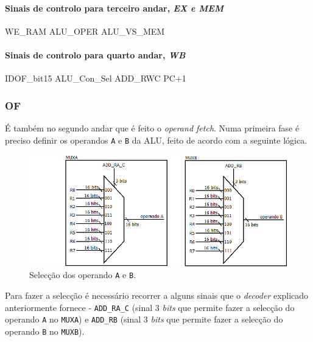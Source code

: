 \documentclass[11pt]{article}
\numberwithin{equation}{section}
\begin{document}
\paragraph{Sinais de controlo para terceiro andar, \textit{EX e MEM}}
WE\_RAM ALU\_OPER ALU\_VS\_MEM 
\paragraph{Sinais de controlo para quarto andar, \textit{WB}}
	IDOF\_bit15 ALU\_Con\_Sel ADD\_RWC PC+1







\subsubsection{OF}

É também no segundo andar que é feito o \textit{operand fetch}. Numa primeira fase é preciso definir os operandos \texttt{A} e \texttt{B} da ALU, feito de acordo com a seguinte lógica.

\begin{figure}[H]
	\centering
	\includegraphics[keepaspectratio=true, scale=0.35]{imagens/OF1}
	\caption{Selecção dos operando \texttt{A} e \texttt{B}.}
	\vspace{-0.8em}
\end{figure}

Para fazer a selecção é necessário recorrer a alguns sinais que o \textit{decoder} explicado anteriormente fornece - \texttt{ADD\_RA\_C} (sinal 3 \textit{bits} que permite fazer a selecção do operando \texttt{A} no \texttt{MUXA}) e \texttt{ADD\_RB} (sinal 3 \textit{bits} que permite fazer a selecção do operando \texttt{B} no \texttt{MUXB}). 
\end{document}
